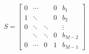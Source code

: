\documentclass{article}
\begin{document}
\begin{align}
S =
    \begin{bmatrix}
        0 & \cdots &        & 0  & b_1\\
        1 & \ddots &        & 0  & b_2 \\
        0 & \ddots & \ddots &    & \vdots \\
          & \ddots & \ddots & 0  & b_{M-2} \\
        0 & \cdots & 0      & 1  & b_{M-1}
    \end{bmatrix}
\end{align}

\clearpage


\end{document}
